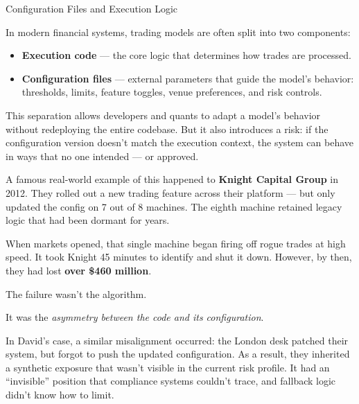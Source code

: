 \begin{TechnicalSidebar}{Configuration Files and Execution Logic}

  In modern financial systems, trading models are often split into two components:

  \medskip

  \begin{itemize}
    \item \textbf{Execution code} — the core logic that determines how trades are processed.
    \item \textbf{Configuration files} — external parameters that guide the model’s behavior: thresholds, 
    limits, feature toggles, venue preferences, and risk controls.
  \end{itemize}

  \medskip

  This separation allows developers and quants to adapt a model’s behavior without redeploying the entire 
  codebase. But it also introduces a risk: if the configuration version doesn’t match the execution context, 
  the system can behave in ways that no one intended — or approved.

  \medskip

  A famous real-world example of this happened to \textbf{Knight Capital Group} in 2012. They rolled out a new 
  trading feature across their platform — but only updated the config on 7 out of 8 machines. The eighth machine 
  retained legacy logic that had been dormant for years. 

  \medskip

  When markets opened, that single machine began firing off rogue trades at high speed. It took Knight 45 minutes 
  to identify and shut it down. However, by then, they had lost \textbf{over \$460 million}.

  \medskip

  The failure wasn’t the algorithm.

  \medskip

  It was the \textit{asymmetry between the code and its configuration}.

  \medskip

  In David’s case, a similar misalignment occurred: the London desk patched their system, but forgot to push the 
  updated configuration. As a result, they inherited a synthetic exposure that wasn’t visible in the current risk 
  profile. It had an ``invisible'' position that compliance systems couldn’t trace, and fallback logic didn’t 
  know how to limit.

\end{TechnicalSidebar}

